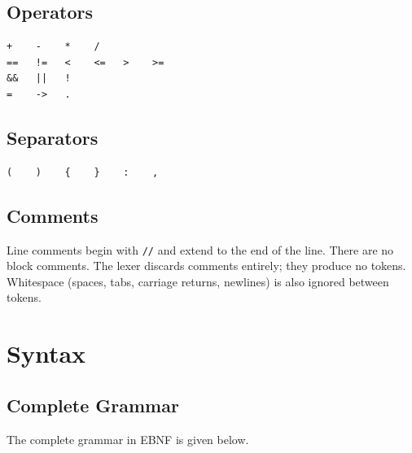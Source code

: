 \documentclass[10pt,a4paper]{article}
\begin{document}
\subsection{Operators}

\begin{lstlisting}[language={}, frame=none, basicstyle=\ttfamily\small]
+    -    *    /
==   !=   <    <=   >    >=
&&   ||   !
=    ->   .
\end{lstlisting}

\subsection{Separators}

\begin{lstlisting}[language={}, frame=none, basicstyle=\ttfamily\small]
(    )    {    }    :    ,
\end{lstlisting}

\subsection{Comments}

Line comments begin with \texttt{//} and extend to the end of the line.
There are no block comments. The lexer discards comments entirely; they
produce no tokens. Whitespace (spaces, tabs, carriage returns, newlines)
is also ignored between tokens.

\section{Syntax}

\subsection{Complete Grammar}

The complete grammar in EBNF is given below.
\end{document}
